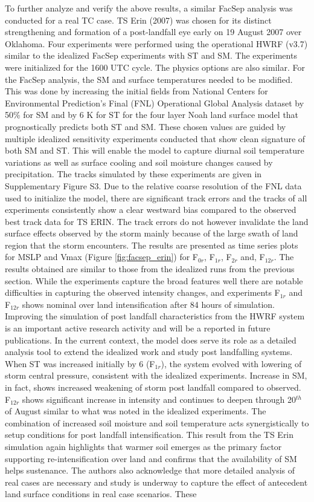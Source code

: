 \documentclass[fleqn,10pt]{wlscirep}
\begin{document}
To further analyze and verify the above results, a similar FacSep analysis was conducted for a real TC case. TS Erin (2007) was chosen for its distinct strengthening and formation of a post-landfall eye early on 19 August 2007 over Oklahoma. Four experiments were performed using the operational HWRF (v3.7) similar to the idealized FacSep experiments with ST and SM. The experiments were initialized for the 1600 UTC cycle. The physics options are also similar. For the FacSep analysis, the SM and surface temperatures needed to be modified. This was done by increasing the initial fields from National Centers for Environmental Prediction’s Final (FNL) Operational Global Analysis dataset by 50\% for SM and by 6 K for ST for the four layer Noah land surface model that prognostically predicts both ST and SM. These chosen values are guided by multiple idealized sensitivity experiments conducted that show clean signature of both SM and ST. This will enable the model to capture diurnal soil temperature variations as well as surface cooling and soil moisture changes caused by precipitation. The tracks simulated by these experiments are given in Supplementary Figure S3. Due to the relative coarse resolution of the FNL data used to initialize the model, there are significant track errors and the tracks of all experiments consistently show a clear westward bias compared to the observed best track data for TS ERIN. The track errors do not however invalidate the land surface effects observed by the storm mainly because of the large swath of land region that the storm encounters. The results are presented as time series plots for MSLP and Vmax (Figure \ref{fig:facsep_erin}) for F$_{0r}$, F$_{1r}$, F$_{2r}$ and, F$_{12r}$. The results obtained are similar to those from the idealized runs from the previous section. While the experiments capture the broad features well there are notable difficulties in capturing the observed intensity changes, and experiments F$_{1r}$ and F$_{12r}$ shows nominal over land intensification after 84 hours of simulation. Improving the simulation of post landfall characteristics from the HWRF system is an important active research activity and will be a reported in future publications. In the current context, the model does serve its role as a detailed analysis tool to extend the idealized work and study post landfalling systems. When ST was increased initially by 6 (F$_{1r}$), the system evolved with lowering of storm central pressure, consistent with the idealized experiments. Increase in SM, in fact, shows increased weakening of storm post landfall compared to observed. F$_{12r}$ shows significant increase in intensity and continues to deepen through 20$^{th}$ of August similar to what was noted in the idealized experiments. The combination of increased soil moisture and soil temperature acts synergistically to setup conditions for post landfall intensification. This result from the TS Erin simulation again highlights that warmer soil emerges as the primary factor supporting re-intensification over land and confirms that the availability of SM helps sustenance. The authors also acknowledge that more detailed analysis of real cases are necessary and study is underway to capture the effect of antecedent land surface conditions in real case scenarios. These 
\end{document}
